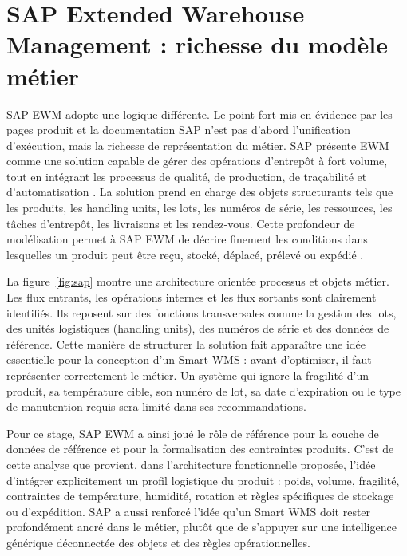 
\section{SAP Extended Warehouse Management  :  richesse du modèle métier}

\label{sec:2.4}

SAP EWM adopte une logique différente. Le point fort mis en évidence par les pages produit et la documentation SAP n’est pas d’abord l’unification d’exécution, mais la richesse de représentation du métier. SAP présente EWM comme une solution capable de gérer des opérations d’entrepôt à fort volume, tout en intégrant les processus de qualité, de production, de traçabilité et d’automatisation \cite{ref6}. La solution prend en charge des objets structurants tels que les produits, les handling units, les lots, les numéros de série, les ressources, les tâches d’entrepôt, les livraisons et les rendez-vous. Cette profondeur de modélisation permet à SAP EWM de décrire finement les conditions dans lesquelles un produit peut être reçu, stocké, déplacé, prélevé ou expédié \cite{ref7}.




La figure~\ref{fig:sap} montre une architecture orientée processus et objets métier. Les flux entrants, les opérations internes et les flux sortants sont clairement identifiés. Ils reposent sur des fonctions transversales comme la gestion des lots, des unités logistiques (handling units), des numéros de série et des données de référence. Cette manière de structurer la solution fait apparaître une idée essentielle pour la conception d’un Smart WMS : avant d’optimiser, il faut représenter correctement le métier. Un système qui ignore la fragilité d’un produit, sa température cible, son numéro de lot, sa date d’expiration ou le type de manutention requis sera limité dans ses recommandations.


Pour ce stage, SAP EWM a ainsi joué le rôle de référence pour la couche de données de référence et pour la formalisation des contraintes produits. C’est de cette analyse que provient, dans l’architecture fonctionnelle proposée, l’idée d’intégrer explicitement un profil logistique du produit : poids, volume, fragilité, contraintes de température, humidité, rotation et règles spécifiques de stockage ou d’expédition. SAP a aussi renforcé l’idée qu’un Smart WMS doit rester profondément ancré dans le métier, plutôt que de s’appuyer sur une intelligence générique déconnectée des objets et des règles opérationnelles.


